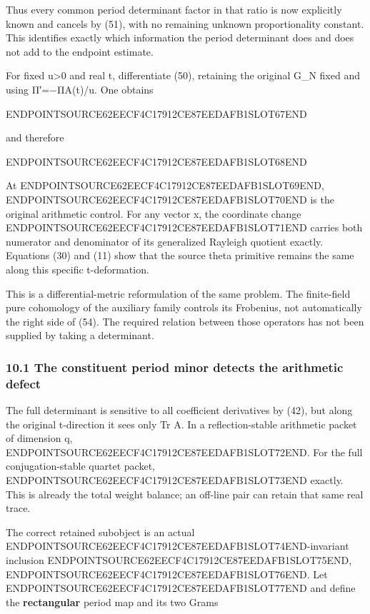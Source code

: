 Thus every common period determinant factor in that ratio is now explicitly known and cancels by (51), with no remaining unknown proportionality constant. This identifies exactly which information the period determinant does and does not add to the endpoint estimate.

For fixed u\textgreater0 and real t, differentiate (50), retaining the original G\_N fixed and using Π′=−ΠA(t)/u. One obtains

ENDPOINTSOURCE62EECF4C17912CE87EEDAFB1SLOT67END

and therefore

ENDPOINTSOURCE62EECF4C17912CE87EEDAFB1SLOT68END

At ENDPOINTSOURCE62EECF4C17912CE87EEDAFB1SLOT69END, ENDPOINTSOURCE62EECF4C17912CE87EEDAFB1SLOT70END is the original arithmetic control. For any vector x, the coordinate change ENDPOINTSOURCE62EECF4C17912CE87EEDAFB1SLOT71END carries both numerator and denominator of its generalized Rayleigh quotient exactly. Equations (30) and (11) show that the source theta primitive remains the same along this specific t-deformation.

This is a differential-metric reformulation of the same problem. The finite-field pure cohomology of the auxiliary family controls its Frobenius, not automatically the right side of (54). The required relation between those operators has not been supplied by taking a determinant.

\subsubsection{10.1 The constituent period minor detects the arithmetic defect}\label{endpoint-sga_trace_period--the-constituent-period-minor-detects-the-arithmetic-defect}

The full determinant is sensitive to all coefficient derivatives by (42), but along the original t-direction it sees only Tr A. In a reflection-stable arithmetic packet of dimension q, ENDPOINTSOURCE62EECF4C17912CE87EEDAFB1SLOT72END. For the full conjugation-stable quartet packet, ENDPOINTSOURCE62EECF4C17912CE87EEDAFB1SLOT73END exactly. This is already the total weight balance; an off-line pair can retain that same real trace.

The correct retained subobject is an actual ENDPOINTSOURCE62EECF4C17912CE87EEDAFB1SLOT74END-invariant inclusion ENDPOINTSOURCE62EECF4C17912CE87EEDAFB1SLOT75END, ENDPOINTSOURCE62EECF4C17912CE87EEDAFB1SLOT76END. Let ENDPOINTSOURCE62EECF4C17912CE87EEDAFB1SLOT77END and define the \textbf{rectangular} period map and its two Grams

